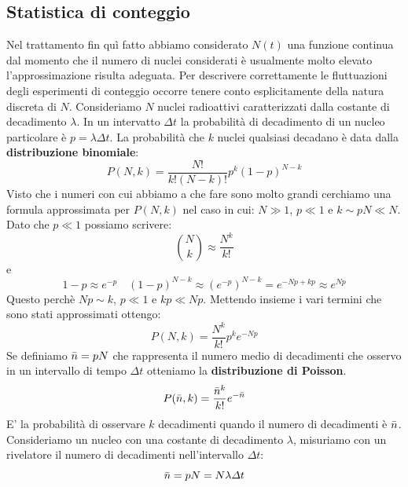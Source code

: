 \subsection{Statistica di conteggio}
Nel trattamento fin quì fatto abbiamo considerato $N(t)$ una funzione continua dal momento che il numero di nuclei considerati è usualmente molto elevato l'approssimazione risulta adeguata. Per descrivere correttamente le fluttuazioni degli esperimenti di conteggio occorre tenere conto esplicitamente della natura discreta di $N$. Consideriamo $N$ nuclei radioattivi caratterizzati dalla costante di decadimento $\lambda$. In un intervatto $\Delta t$ la probabilità di decadimento di un nucleo particolare è $p=\lambda\Delta t$. La probabilità che $k$ nuclei qualsiasi decadano è data dalla \textbf{distribuzione binomiale}:
\begin{equation*}
    P(N,k)=\frac{N!}{k!(N-k)!}p^k(1-p)^{N-k}
\end{equation*}
Visto che i numeri con cui abbiamo a che fare sono molto grandi cerchiamo una formula approssimata per $P(N,k)$ nel caso in cui: $N\gg1$, $p\ll1$ e $k\sim pN\ll N$. Dato che $p\ll1$ possiamo scrivere:
\begin{equation*}
    \binom{N}{k}\approx\frac{N^k}{k!}
\end{equation*}
e
\begin{equation*}
    1-p\approx e^{-p} \quad (1-p)^{N-k}\approx(e^{-p})^{N-k}=e^{-Np+kp}\approx e^{Np}
\end{equation*}
Questo perchè $Np\sim k $, $p\ll1$ e $kp\ll Np$. Mettendo insieme i vari termini che sono stati approssimati ottengo:
\begin{equation*}
 P(N,k)=\frac{N^k}{k!}p^ke^{-Np}   
\end{equation*}
Se definiamo $\Bar{n}=pN$ che rappresenta il numero medio di decadimenti che osservo in un intervallo di tempo $\Delta t$ otteniamo la \textbf{distribuzione di Poisson}. 
\begin{equation*}
    P(\Bar{n},k)=\frac{\Bar{n}^k}{k!}e^{-\Bar{n}}
\end{equation*}
E' la probabilità di osservare $k$ decadimenti quando il numero di decadimenti è $\Bar{n}$. Consideriamo un nucleo con una costante di decadimento $\lambda$, misuriamo con un rivelatore il numero di decadimenti nell'intervallo $\Delta t$:
\begin{equation*}
    \Bar{n}=pN=N\lambda\Delta t
\end{equation*}
